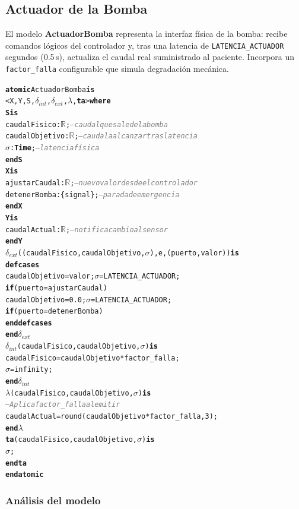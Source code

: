 \documentclass[12pt,a4paper]{article}
\newcommand{\kw}[1]{\textbf{#1}}
\newcommand{\cmlR}{$\mathbb{R}$}
\newcommand{\cmlTime}{\textbf{Time}}
\newcommand{\cmlsigma}{$\sigma$}
\newcommand{\dint}{$\delta_{\mathit{int}}$}
\newcommand{\dext}{$\delta_{\mathit{ext}}$}
\newcommand{\clambda}{$\lambda$}
\newcommand{\cmlta}{\textbf{ta}}
\newcommand{\cmlcomment}[1]{\textit{\textcolor{gray}{#1}}}
\newenvironment{cmldevs}{%
  \begin{alltt}\small%
}{%
  \end{alltt}%
}
\begin{document}
\subsection{Actuador de la Bomba}

El modelo \textbf{ActuadorBomba} representa la interfaz física de la
bomba: recibe comandos lógicos del controlador y, tras una latencia de
\texttt{LATENCIA\_ACTUADOR} segundos (0.5\,s), actualiza el caudal real
suministrado al paciente.  Incorpora un \texttt{factor\_falla}
configurable que simula degradación mecánica.

\begin{center}
\begin{cmldevs}
\kw{atomic} ActuadorBomba \kw{is}
    <X, Y, S, \dint{}, \dext{}, \clambda{}, \cmlta{}> \kw{where}
\kw{S is}
    caudalFisico   : \cmlR{};       \cmlcomment{-- caudal que sale de la bomba}
    caudalObjetivo : \cmlR{};       \cmlcomment{-- caudal a alcanzar tras latencia}
    \cmlsigma{}            : \cmlTime{};    \cmlcomment{-- latencia física}
\kw{end S}
\kw{X is}
    ajustarCaudal : \cmlR{};        \cmlcomment{-- nuevo valor desde el controlador}
    detenerBomba  : \{signal\};     \cmlcomment{-- parada de emergencia}
\kw{end X}
\kw{Y is}
    caudalActual : \cmlR{};         \cmlcomment{-- notifica cambio al sensor}
\kw{end Y}
\dext{}((caudalFisico, caudalObjetivo, \cmlsigma{}), e, (puerto, valor)) \kw{is}
    \kw{defcases}
        caudalObjetivo = valor;   \cmlsigma{} = LATENCIA\_ACTUADOR;
            \kw{if} (puerto = ajustarCaudal)
        caudalObjetivo = 0.0;     \cmlsigma{} = LATENCIA\_ACTUADOR;
            \kw{if} (puerto = detenerBomba)
    \kw{end defcases}
\kw{end} \dext{}
\dint{}(caudalFisico, caudalObjetivo, \cmlsigma{}) \kw{is}
    caudalFisico = caudalObjetivo * factor\_falla;
    \cmlsigma{}          = infinity;
\kw{end} \dint{}
\clambda{}(caudalFisico, caudalObjetivo, \cmlsigma{}) \kw{is}
    \cmlcomment{-- Aplica factor\_falla al emitir}
    caudalActual = round(caudalObjetivo * factor\_falla, 3);
\kw{end} \clambda{}
\cmlta{}(caudalFisico, caudalObjetivo, \cmlsigma{}) \kw{is}
    \cmlsigma{};
\kw{end} \cmlta{}
\kw{end atomic}
\end{cmldevs}
\label{fig:actuador-bomba}
\end{center}

\subsubsection*{Análisis del modelo}
\end{document}
